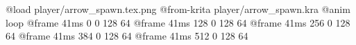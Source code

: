 @load player/arrow_spawn.tex.png
@from-krita player/arrow_spawn.kra
@anim loop
	@frame 41ms 0 0 128 64
	@frame 41ms 128 0 128 64
	@frame 41ms 256 0 128 64
	@frame 41ms 384 0 128 64
	@frame 41ms 512 0 128 64
